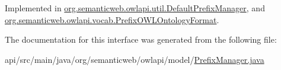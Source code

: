 Implemented in \hyperlink{classorg_1_1semanticweb_1_1owlapi_1_1util_1_1_default_prefix_manager_aa0beec436abd20398c47a0c7a914da4c}{org.\-semanticweb.\-owlapi.\-util.\-Default\-Prefix\-Manager}, and \hyperlink{classorg_1_1semanticweb_1_1owlapi_1_1vocab_1_1_prefix_o_w_l_ontology_format_a18b4291000ba1e590e2db8121108c7b0}{org.\-semanticweb.\-owlapi.\-vocab.\-Prefix\-O\-W\-L\-Ontology\-Format}.



The documentation for this interface was generated from the following file\-:\begin{DoxyCompactItemize}
\item 
api/src/main/java/org/semanticweb/owlapi/model/\hyperlink{_prefix_manager_8java}{Prefix\-Manager.\-java}\end{DoxyCompactItemize}

